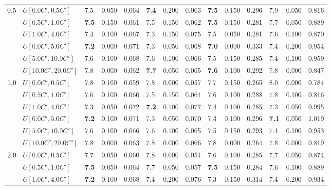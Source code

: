 \begin{table}[h]
{\begin{tabular}{|l|l||l|l|l||l|l|l||l|l|l||l|l|l|}
      \hline\hline
      \multirow{6}{*}{0.5} & $U[0.0C',0.5C']$ & 7.5 & 0.050 & 0.064 & \textbf{7.4} & 0.200 & 0.063 & \textbf{7.5} & 0.150 & 0.296 & 7.9 & 0.050 & 0.816 \\
       & $U[0.5C',1.0C']$ & \textbf{7.5} & 0.150 & 0.061 & 7.5 & 0.150 & 0.062 & \textbf{7.5} & 0.150 & 0.281 & 7.7 & 0.050 & 0.889 \\
       & $U[1.0C',4.0C']$ & 7.4 & 0.100 & 0.067 & 7.3 & 0.150 & 0.075 & 7.5 & 0.050 & 0.281 & 7.6 & 0.100 & 0.870 \\
       & $U[0.0C',5.0C']$ & \textbf{7.2} & 0.000 & 0.071 & 7.3 & 0.050 & 0.068 & \textbf{7.0} & 0.000 & 0.333 & 7.4 & 0.200 & 0.954 \\
       & $U[5.0C',10.0C']$ & 7.6 & 0.100 & 0.068 & 7.6 & 0.100 & 0.066 & 7.5 & 0.150 & 0.285 & 7.4 & 0.100 & 0.959 \\
       & $U[10.0C',20.0C']$ & 7.8 & 0.000 & 0.062 & \textbf{7.7} & 0.050 & 0.065 & \textbf{7.6} & 0.100 & 0.292 & 7.8 & 0.000 & 0.847 \\
      \hline\hline
      \multirow{6}{*}{1.0} & $U[0.0C',0.5C']$ & 7.8 & 0.100 & 0.059 & 7.8 & 0.000 & 0.057 & 7.7 & 0.150 & 0.265 & 8.0 & 0.000 & 0.784 \\
       & $U[0.5C',1.0C']$ & 7.6 & 0.100 & 0.060 & 7.5 & 0.150 & 0.064 & 7.6 & 0.100 & 0.288 & 7.8 & 0.100 & 0.816 \\
       & $U[1.0C',4.0C']$ & 7.3 & 0.050 & 0.072 & \textbf{7.2} & 0.100 & 0.077 & 7.4 & 0.100 & 0.285 & 7.3 & 0.050 & 0.995 \\
       & $U[0.0C',5.0C']$ & \textbf{7.2} & 0.100 & 0.071 & 7.3 & 0.050 & 0.070 & 7.4 & 0.100 & 0.296 & \textbf{7.1} & 0.050 & 1.019 \\
       & $U[5.0C',10.0C']$ & 7.6 & 0.100 & 0.066 & 7.6 & 0.100 & 0.065 & 7.5 & 0.150 & 0.293 & 7.4 & 0.100 & 0.953 \\
       & $U[10.0C',20.0C']$ & 7.8 & 0.000 & 0.063 & 7.8 & 0.000 & 0.066 & 7.8 & 0.000 & 0.264 & 7.8 & 0.000 & 0.819 \\
      \hline\hline
      \multirow{6}{*}{2.0} & $U[0.0C',0.5C']$ & 7.7 & 0.050 & 0.060 & 7.8 & 0.000 & 0.054 & 7.6 & 0.100 & 0.285 & 7.7 & 0.050 & 0.874 \\
       & $U[0.5C',1.0C']$ & \textbf{7.5} & 0.050 & 0.064 & 7.7 & 0.050 & 0.057 & \textbf{7.5} & 0.150 & 0.284 & 7.6 & 0.100 & 0.889 \\
       & $U[1.0C',4.0C']$ & \textbf{7.2} & 0.100 & 0.068 & 7.4 & 0.200 & 0.076 & 7.3 & 0.150 & 0.314 & 7.4 & 0.200 & 0.934 \\

\end{tabular}}
\end{table}
